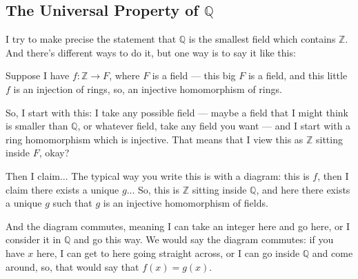 \subsection{The Universal Property of \texorpdfstring{$\mathbb{Q}$}{Q}}

\begin{speech}[00:17:25 - 00:19:32]
I try to make precise the statement that $\mathbb{Q}$ is the smallest field which contains $\mathbb{Z}$. And there's different ways to do it, but one way is to say it like this:

Suppose I have $f \colon \mathbb{Z} \to F$,  where $F$ is a field  --- this big $F$ is a field, and this little $f$ is an injection of rings, so, an injective homomorphism of rings. 

So, I start with this: I take any possible field --- maybe a field that I might think is smaller than $\mathbb{Q}$, or whatever field, take any field you want --- and I start with a ring homomorphism which is injective. That means that I view this as $\mathbb{Z}$ sitting inside $F$, okay?

Then I claim...  The typical way you write this is with a diagram: this is $f$, then I claim there exists a unique $g$... So, this is $\mathbb{Z}$ sitting inside $\mathbb{Q}$, and here there exists a unique $g$  such that $g$ is an injective homomorphism of fields. 

And the diagram commutes, meaning I can take an integer here and go here, or I consider it in $\mathbb{Q}$ and go this way. We would say the diagram commutes: if you have $x$ here, I can get to here going straight across, or I can go inside $\mathbb{Q}$ and come around, so, that would say that $f(x) = g(x)$. 
\end{speech}

